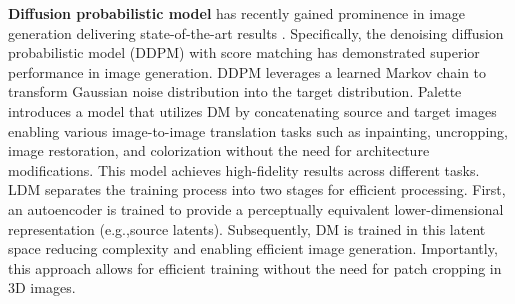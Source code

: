 \documentclass[10pt,twocolumn,letterpaper]{article}
\begin{document}
\noindent \textbf{Diffusion probabilistic model} has recently gained prominence in image generation delivering state-of-the-art results \cite{ho2020denoising, choi2021ilvr, dhariwal2021diffusion, saharia2022palette, pinaya2022brain, croitoru2023diffusion}. Specifically, the denoising diffusion probabilistic model (DDPM) \cite{ho2020denoising} with score matching has demonstrated superior performance in image generation. DDPM leverages a learned Markov chain to transform Gaussian noise distribution into the target distribution. Palette \cite{saharia2022palette} introduces a model that utilizes DM by concatenating source and target images enabling various image-to-image translation tasks such as inpainting, uncropping, image restoration, and colorization without the need for architecture modifications. This model achieves high-fidelity results across different tasks.  LDM \cite{rombach2022high} separates the training process into two stages for efficient processing. First, an autoencoder is trained to provide a perceptually equivalent lower-dimensional representation (e.g.,source latents). Subsequently, DM is trained in this latent space reducing complexity and enabling efficient image generation. Importantly, this approach allows for efficient training without the need for patch cropping in 3D images.

\end{document}
